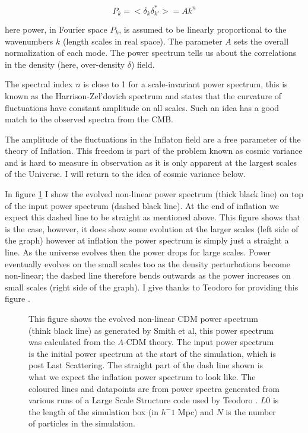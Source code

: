 \begin{equation}
P_k = < \delta_k \delta_{k'}^* > = A k^{n}
\end{equation}

\noindent here power, in Fourier space $P_k$, is assumed to be linearly proportional to the wavenumbers $k$ (length scales in real space). The parameter $A$ sets the overall normalization of each mode. The power spectrum tells us about the correlations in the density (here, over-density $\delta$) field.

The spectral index $n$ is close to 1 for a scale-invariant power spectrum, this is known as the Harrison-Zel'dovich spectrum \citep{bib_harrison, bib_zeld} and states that the curvature of fluctuations have constant amplitude on all scales. Such an idea has a good match to the observed spectra from the CMB. \citep{bib_baum}

The amplitude of the fluctuations in the Inflaton field are a free parameter of the theory of Inflation. This freedom is part of the problem known as cosmic variance and is hard to measure in observation as it is only apparent at the largest scales of the Universe. I will return to the idea of cosmic variance below.

In figure \ref{fig.cdmpower} I show the evolved non-linear power spectrum (thick black line) on top of the input power spectrum (dashed black line). At the end of inflation we expect this dashed line to be straight as mentioned above. This figure shows that is the case, however, it does show some evolution at the larger scales (left side of the graph) however at inflation the power spectrum is simply just a straight a line. As the universe evolves then the power drops for large scales. Power eventually evolves on the small scales too as the density perturbations become non-linear; the dashed line therefore bends outwards as the power increases on small scales (right side of the graph). I give thanks to Teodoro for providing this figure \citep{bib_teodoro}.

\begin{figure}[htb]
   \begin{center}
     \leavevmode
                \epsfxsize=145mm

   \end{center}
\caption{This figure shows the evolved non-linear CDM power spectrum (think black line) as generated by Smith et al, this power spectrum was calculated from the $\Lambda$-CDM theory. The input power spectrum is the initial power spectrum at the start of the simulation, which is post Last Scattering. The straight part of the dash line shown is what we expect the inflation power spectrum to look like. The coloured lines and datapoints are from power spectra generated from various runs of a Large Scale Structure code used by Teodoro \citep{bib_teodoro}. $L0$ is the length of the simulation box (in $h^-1$ Mpc) and $N$ is the number of particles in the simulation.}
\label{fig.cdmpower}
\end{figure}


